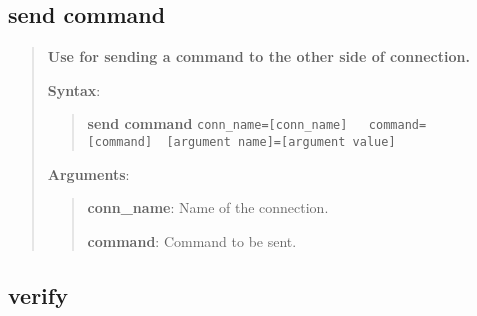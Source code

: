 \hypertarget{description-send-command}{%
\subsection{\texorpdfstring{\textbf{send
command}}{send command}}\label{description-send-command}}

\begin{quote}
\textbf{Use for sending a command to the other side of connection.}

\textbf{Syntax}:

\begin{quote}

\textbf{send command}
\texttt{conn\_name={[}conn\_name{]}\ \ \ command={[}command{]}\ \ {[}argument name{]}={[}argument value{]}}
\end{quote}

\textbf{Arguments}:

\begin{quote}
\textbf{conn\_name}: Name of the connection.

\textbf{command}: Command to be sent.
\end{quote}
\end{quote}

\hypertarget{description-verify}{%
\subsection{\texorpdfstring{\textbf{verify}}{verify}}\label{description-verify}}

